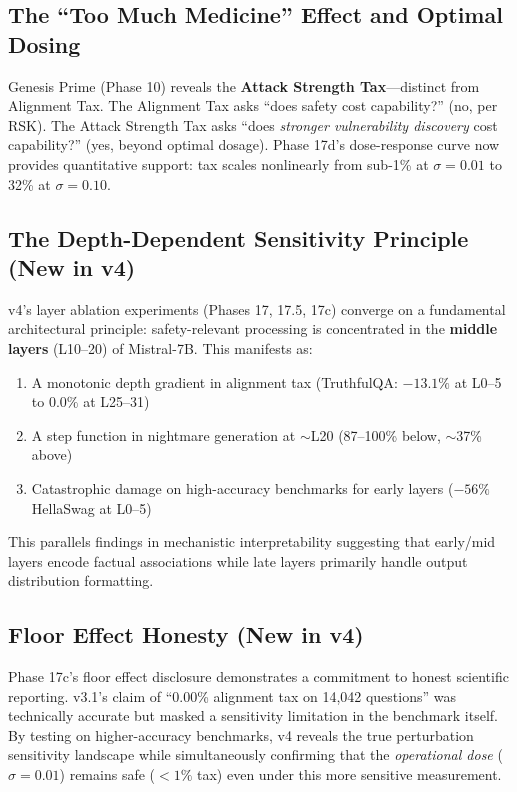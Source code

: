 \documentclass[11pt,a4paper]{article}
\begin{document}
\subsection{The ``Too Much Medicine'' Effect and Optimal Dosing}

Genesis Prime (Phase 10) reveals the \textbf{Attack Strength Tax}---distinct from Alignment Tax. The Alignment Tax asks ``does safety cost capability?'' (no, per RSK). The Attack Strength Tax asks ``does \emph{stronger vulnerability discovery} cost capability?'' (yes, beyond optimal dosage). Phase 17d's dose-response curve now provides quantitative support: tax scales nonlinearly from sub-1\% at $\sigma = 0.01$ to 32\% at $\sigma = 0.10$.

\subsection{The Depth-Dependent Sensitivity Principle (New in v4)}

v4's layer ablation experiments (Phases 17, 17.5, 17c) converge on a fundamental architectural principle: safety-relevant processing is concentrated in the \textbf{middle layers} (L10--20) of Mistral-7B. This manifests as:
\begin{enumerate}
    \item A monotonic depth gradient in alignment tax (TruthfulQA: $-13.1\%$ at L0--5 to $0.0\%$ at L25--31)
    \item A step function in nightmare generation at $\sim$L20 (87--100\% below, $\sim$37\% above)
    \item Catastrophic damage on high-accuracy benchmarks for early layers ($-56\%$ HellaSwag at L0--5)
\end{enumerate}

This parallels findings in mechanistic interpretability suggesting that early/mid layers encode factual associations while late layers primarily handle output distribution formatting.

\subsection{Floor Effect Honesty (New in v4)}

Phase 17c's floor effect disclosure demonstrates a commitment to honest scientific reporting. v3.1's claim of ``0.00\% alignment tax on 14,042 questions'' was technically accurate but masked a sensitivity limitation in the benchmark itself. By testing on higher-accuracy benchmarks, v4 reveals the true perturbation sensitivity landscape while simultaneously confirming that the \emph{operational dose} ($\sigma = 0.01$) remains safe ($<1\%$ tax) even under this more sensitive measurement.
\end{document}

